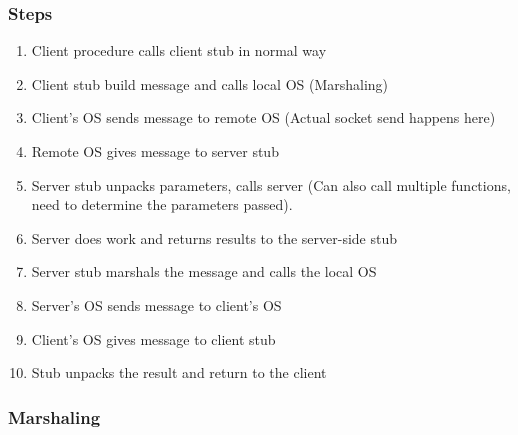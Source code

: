 \subsubsection{Steps}\label{subsubsec:RPC_Steps}
\begin{enumerate}[noitemsep]
\item Client procedure calls client stub in normal way
\item Client stub build message and calls local OS (Marshaling)
\item Client's OS sends message to remote OS (Actual socket send happens here)
\item Remote OS gives message to server stub
\item Server stub unpacks parameters, calls server (Can also call multiple functions, need to determine the parameters passed).
\item Server does work and returns results to the server-side stub
\item Server stub marshals the message and calls the local OS
\item Server's OS sends message to client's OS
\item Client's OS gives message to client stub
\item Stub unpacks the result and return to the client
\end{enumerate}

\subsubsection{Marshaling}\label{subsubsec:RPC_Marshaling}

